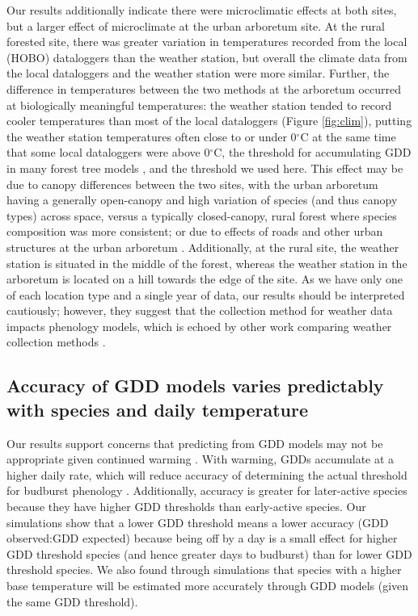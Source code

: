 \documentclass{article}\usepackage[]{graphicx}\usepackage[]{color}
\begin{document}
Our results additionally indicate there were microclimatic effects at both sites, but a larger effect of microclimate at the urban arboretum site. At the rural forested site, there was greater variation in temperatures recorded from the local (HOBO) dataloggers than the weather station, but overall the climate data from the local dataloggers and the weather station were more similar. Further, the difference in temperatures between the two methods at the arboretum occurred at biologically meaningful temperatures: the weather station tended to record cooler temperatures than most of the local dataloggers (Figure \ref{fig:clim}), putting the weather station temperatures often close to or under 0$^{\circ}$C at the same time that some local dataloggers were above 0$^{\circ}$C, the threshold for accumulating GDD in many forest tree models \citep{Man2010}, and the threshold we used here. This effect may be due to canopy differences between the two sites, with the urban arboretum having a generally open-canopy and high variation of species (and thus canopy types) across space, versus a typically closed-canopy, rural forest where species composition was more consistent; or due to effects of roads and other urban structures at the urban arboretum \citep{Stabler2005,Erell2012,Dimoudi2013}. Additionally, at the rural site, the weather station is situated in the middle of the forest, whereas the weather station in the arboretum is located on a hill towards the edge of the site. As we have only one of each location type and a single year of data, our results should be interpreted cautiously; however, they suggest that the collection method for weather data impacts phenology models, which is echoed by other work comparing weather collection methods \citep[e.g.,][]{Laigle2021}.

\subsection*{Accuracy of GDD models varies predictably with species and daily temperature} 
Our results support concerns that predicting from GDD models may not be appropriate given continued warming \citep{Man2010}. With warming, GDDs accumulate at a higher daily rate, which will reduce accuracy of determining the actual threshold for budburst phenology \citep{Bonhomme2000}. Additionally, accuracy is greater for later-active species because they have higher GDD thresholds than early-active species. Our simulations show that a lower GDD threshold means a lower accuracy (GDD observed:GDD expected) because being off by a day is a small effect for higher GDD threshold species (and hence greater days to budburst) than for lower GDD threshold species. We also found through simulations that species with a higher base temperature will be estimated more accurately through GDD models (given the same GDD threshold). 
\end{document}
